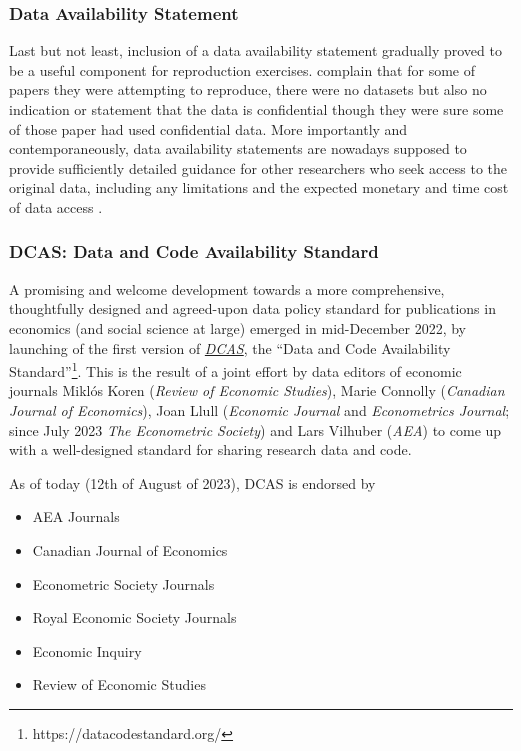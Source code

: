 \documentclass[11pt]{article}
\begin{document}
\subsubsection{Data Availability Statement}
Last but not least, inclusion of a data availability statement gradually proved to be a useful component for reproduction exercises. \cite{mccullough2006lessons} complain that for some of papers they were attempting to reproduce, there were no datasets but also no indication or statement that the data is confidential though they were sure some of those paper had used confidential data. More importantly and contemporaneously, data availability statements are nowadays supposed to provide sufficiently detailed guidance for other researchers who seek access to the original data, including any limitations and the expected monetary and time cost of data access \cite{koren2022dcas}. 

\subsubsection{DCAS: Data and Code Availability Standard}
A promising and welcome development towards a more comprehensive, thoughtfully designed and agreed-upon data policy standard for publications in economics (and social science at large) emerged in mid-December 2022, by launching of the first version of \href{https://datacodestandard.org/}{\textit{DCAS}}, the ``Data and Code Availability Standard''\footnote{https://datacodestandard.org/}.
This is the result of a joint effort by data editors of economic journals Miklós Koren (\textit{Review of Economic Studies}), Marie Connolly (\textit{Canadian Journal of Economics}), Joan Llull (\textit{Economic Journal} and \textit{Econometrics Journal}; since July 2023 \textit{The Econometric Society}) and Lars Vilhuber (\textit{AEA}) to come up with a well-designed standard for sharing research data and code.

As of today (12th of August of 2023), DCAS is endorsed by
\begin{itemize}
\item AEA Journals
\item Canadian Journal of Economics
\item Econometric Society Journals
\item Royal Economic Society Journals
\item Economic Inquiry
\item Review of Economic Studies
\end{itemize}
\end{document}
